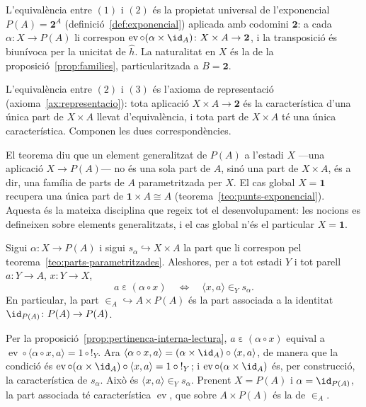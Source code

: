 \begin{prova}
L'equivalència entre \((1)\) i \((2)\) és la propietat universal de
l'exponencial \(P(A)=\mathbf2^{A}\)
(definició~\ref{def:exponencial}) aplicada amb codomini \(\mathbf2\): a
cada \(\alpha\colon X\to P(A)\) li correspon
\(\operatorname{ev}\circ(\alpha\times\id_A)\colon X\times A\to\mathbf2\), i
la transposició és biunívoca per la unicitat de \(\widehat h\). La
naturalitat en \(X\) és la de la proposició~\ref{prop:families},
particularitzada a \(B=\mathbf2\).

L'equivalència entre \((2)\) i \((3)\) és l'axioma de representació
(axioma~\ref{ax:representacio}): tota aplicació \(X\times A\to\mathbf2\) és
la característica d'una única part de \(X\times A\) llevat d'equivalència,
i tota part de \(X\times A\) té una única característica. Componen les dues
correspondències.
\end{prova}

\begin{observacio}\label{obs:generalitzats-parts}
El teorema diu que un element generalitzat de \(P(A)\) a l'estadi \(X\)
---una aplicació \(X\to P(A)\)--- no és una sola part de \(A\), sinó una
part de \(X\times A\), és a dir, una família de parts de \(A\)
parametritzada per \(X\). El cas global \(X=\mathbf1\) recupera una única
part de \(\mathbf1\times A\cong A\)
(teorema~\ref{teo:punts-exponencial}). Aquesta és la mateixa disciplina
que regeix tot el desenvolupament: les nocions es defineixen sobre
elements generalitzats, i el cas global n'és el particular \(X=\mathbf1\).
\end{observacio}

\begin{corollari}\label{cor:pertinenca-universal}
Sigui \(\alpha\colon X\to P(A)\) i sigui \(s_\alpha\hookrightarrow
X\times A\) la part que li correspon pel
teorema~\ref{teo:parts-parametritzades}. Aleshores, per a tot estadi
\(Y\) i tot parell \(a\colon Y\to A\), \(x\colon Y\to X\),
\[
a\mathrel{\varepsilon}(\alpha\circ x)
\quad\Longleftrightarrow\quad
\langle x,a\rangle\in_Y s_\alpha .
\]
En particular, la part \(\in_A\hookrightarrow A\times P(A)\) és la part
associada a la identitat \(\id_{P(A)}\colon P(A)\to P(A)\).
\end{corollari}

\begin{prova}
Per la proposició~\ref{prop:pertinenca-interna-lectura},
\(a\mathrel{\varepsilon}(\alpha\circ x)\) equival a
\(\operatorname{ev}\circ\langle\alpha\circ x,a\rangle=1\circ{!}_Y\). Ara
\(\langle\alpha\circ x,a\rangle=(\alpha\times\id_A)\circ\langle x,a\rangle\),
de manera que la condició és
\(\operatorname{ev}\circ(\alpha\times\id_A)\circ\langle x,a\rangle
=1\circ{!}_Y\); i \(\operatorname{ev}\circ(\alpha\times\id_A)\) és, per
construcció, la característica de \(s_\alpha\). Això és
\(\langle x,a\rangle\in_Y s_\alpha\). Prenent \(X=P(A)\) i
\(\alpha=\id_{P(A)}\), la part associada té característica
\(\operatorname{ev}\), que sobre \(A\times P(A)\) és la de \(\in_A\).
\end{prova}

